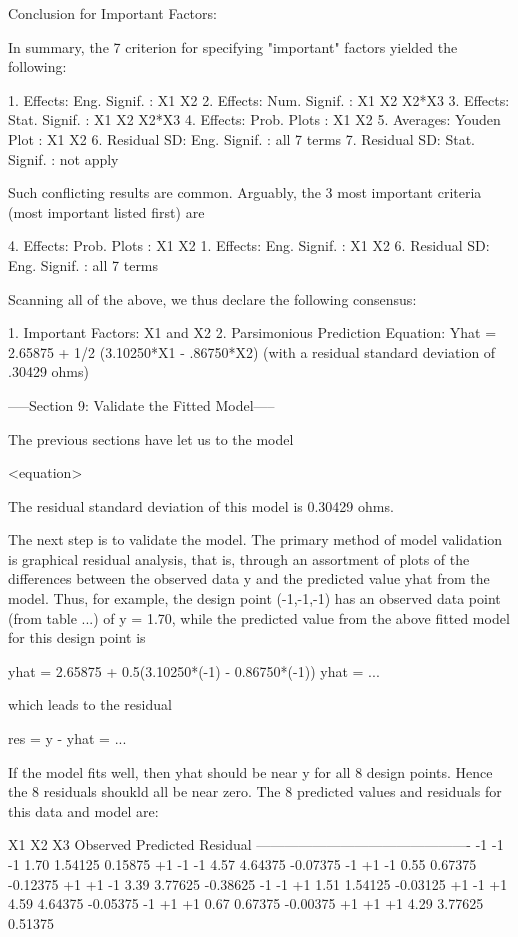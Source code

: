 Conclusion for Important Factors:

In summary, the 7 criterion for specifying "important" factors
yielded the following:

   1. Effects: Eng. Signif.       : X1 X2
   2. Effects: Num. Signif.       : X1 X2 X2*X3
   3. Effects: Stat. Signif.      : X1 X2 X2*X3
   4. Effects: Prob. Plots        : X1 X2
   5. Averages: Youden Plot       : X1 X2
   6. Residual SD: Eng. Signif.   : all 7 terms
   7. Residual SD: Stat. Signif.  : not apply

Such conflicting results are common.  Arguably,
the 3 most important criteria (most important
listed first) are

   4. Effects: Prob. Plots        : X1 X2
   1. Effects: Eng. Signif.       : X1 X2
   6. Residual SD: Eng. Signif.   : all 7 terms

Scanning all of the above, we thus declare the
following consensus:

   1. Important Factors:
         X1 and X2
   2. Parsimonious Prediction Equation:
         Yhat = 2.65875 + 1/2 (3.10250*X1 - .86750*X2)
         (with a residual standard deviation of .30429 ohms)

-----Section 9: Validate the Fitted Model-----

The previous sections have let us to the model

   <equation>

The residual standard deviation of this model is
0.30429 ohms.

The next step is to validate the model.  The
primary method of model validation is graphical
residual analysis, that is, through an assortment
of plots of the differences between the observed
data y and the predicted value yhat from the
model.  Thus, for example, the design point
(-1,-1,-1) has an observed data point (from table
...) of y = 1.70, while the predicted value from
the above fitted model for this design point is

   yhat = 2.65875 + 0.5(3.10250*(-1) - 0.86750*(-1))
   yhat = ...

which leads to the residual

   res = y - yhat = ...

If the model fits well, then yhat should be near y
for all 8 design points.  Hence the 8 residuals
shoukld all be near zero.  The 8 predicted values
and residuals for this data and model are:

   X1   X2   X3  Observed Predicted  Residual
----------------------------------------------
   -1   -1   -1    1.70    1.54125    0.15875
   +1   -1   -1    4.57    4.64375   -0.07375
   -1   +1   -1    0.55    0.67375   -0.12375
   +1   +1   -1    3.39    3.77625   -0.38625
   -1   -1   +1    1.51    1.54125   -0.03125
   +1   -1   +1    4.59    4.64375   -0.05375
   -1   +1   +1    0.67    0.67375   -0.00375
   +1   +1   +1    4.29    3.77625    0.51375

